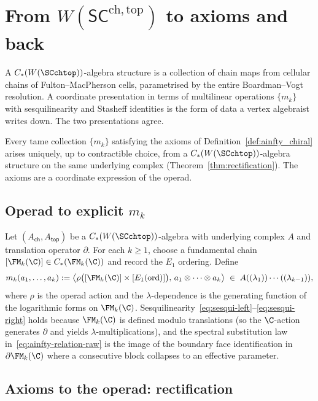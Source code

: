 \section{From $W(\mathsf{SC}^{\mathrm{ch,top}})$ to axioms and back}
\label{ch:theory-equivalence}

A $C_\ast(W(\SCchtop))$-algebra structure is a collection of chain
maps from cellular chains of Fulton--MacPherson cells, parametrised
by the entire Boardman--Vogt resolution. A coordinate presentation
in terms of multilinear operations $\{m_k\}$ with sesquilinearity
and Stasheff identities is the form of data a vertex algebraist
writes down. The two presentations agree.

Every tame collection $\{m_k\}$ satisfying the axioms of
Definition~\ref{def:ainfty_chiral} arises uniquely, up to
contractible choice, from a $C_\ast(W(\SCchtop))$-algebra
structure on the same underlying complex (Theorem~\ref{thm:rectification}).
The axioms are a coordinate expression of the operad.

\subsection{Operad to explicit $m_k$}
\label{subsec:operad-to-mk-equiv}

Let $(A_{\mathsf{ch}}, A_{\mathsf{top}})$ be a $C_\ast(W(\SCchtop))$-algebra with
underlying complex $A$ and translation operator $\partial$.
For each $k \ge 1$, choose a fundamental chain
$[\FM_k(\C)] \in C_\ast(\FM_k(\C))$ and record the $E_1$ ordering.
Define
\[
 m_k(a_1,\ldots,a_k)
 := \bigl\langle \rho\bigl([\FM_k(\C)] \times [E_1(\text{ord})]\bigr),\,
 a_1 \otimes \cdots \otimes a_k \bigr\rangle
 \;\in\; A((\lambda_1))\cdots((\lambda_{k-1})),
\]
where $\rho$ is the operad action and the $\lambda$-dependence
is the generating function of the logarithmic forms on $\FM_k(\C)$.
Sesquilinearity~\eqref{eq:sesqui-left}--\eqref{eq:sesqui-right}
holds because $\FM_k(\C)$ is defined modulo translations (so the
$\C$-action generates $\partial$ and yields $\lambda$-multiplications),
and the spectral substitution law in~\eqref{eq:ainfty-relation-raw}
is the image of the boundary face identification in $\partial\FM_k(\C)$
where a consecutive block collapses to an effective parameter.

\subsection{Axioms to the operad: rectification}
\label{subsec:rectification-equiv}

